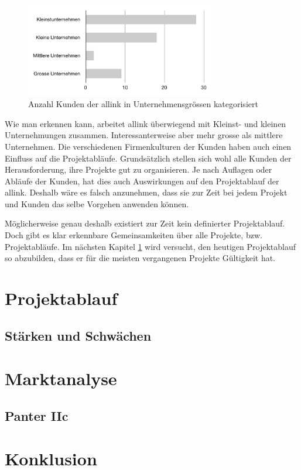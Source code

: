 \begin{figure}[htbp]
\begin{center}
\includegraphics[width=0.75\textwidth,angle=0]{./bilder/analyse/kundenkategorisierung.pdf}
\caption{Anzahl Kunden der allink in Unternehmensgrössen kategorisiert}
\label{pic:kundenkategorisierung}
\end{center}
\end{figure}

Wie man erkennen kann, arbeitet allink überwiegend mit Kleinst- und kleinen 
Unternehmungen zusammen. Interessanterweise aber mehr grosse als mittlere
Unternehmen. Die verschiedenen Firmenkulturen der Kunden haben auch einen 
Einfluss auf die Projektabläufe. Grundsätzlich stellen sich wohl alle Kunden
der Herausforderung, ihre Projekte gut zu organisieren. Je nach Auflagen oder
Abläufe der Kunden, hat dies auch Auswirkungen auf den Projektablauf der allink.
Deshalb wäre es falsch anzunehmen, dass sie zur Zeit bei jedem Projekt und 
Kunden das selbe Vorgehen anwenden können.

Möglicherweise genau deshalb existiert zur Zeit kein definierter Projektablauf. 
Doch gibt es klar erkennbare Gemeinsamkeiten über alle Projekte, bzw. Projektabläufe.
Im nächsten Kapitel \ref{chap:projektablauf} wird versucht, den heutigen Projektablauf so 
abzubilden, dass er für die meisten vergangenen Projekte Gültigkeit hat.

\section{Projektablauf}\label{chap:projektablauf}


% 

\subsection{Stärken und Schwächen}


\section{Marktanalyse}
\subsection{Panter IIc}

\section{Konklusion}

